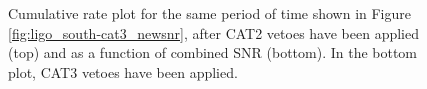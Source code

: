 \begin{figure}[p]
\center
{}
\label{fig:ligo_south-cat2_and_snr}
\caption{Cumulative rate plot for the same period of time shown in Figure
\ref{fig:ligo_south-cat3_newsnr}, after CAT2 vetoes have been applied (top) and
as a function of combined SNR (bottom). In the bottom plot, CAT3 vetoes
have been applied.}
\end{figure}


